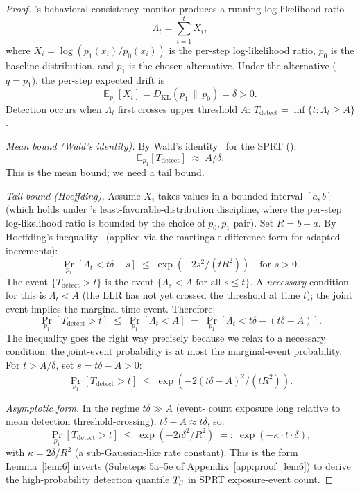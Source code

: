 \begin{proof}
\citep[Exogenous~Verification]{lasser2026exo}'s behavioral consistency monitor produces a running
log-likelihood ratio
\[
  \Lambda_t = \sum_{i=1}^t X_i,
\]
where $X_i = \log(p_1(x_i)/p_0(x_i))$ is the per-step log-likelihood
ratio, $p_0$ is the baseline distribution, and $p_1$ is the chosen
alternative. Under the alternative ($q = p_1$), the per-step
expected drift is
\[
  \mathbb{E}_{p_1}[X_i] = D_{\mathrm{KL}}(p_1 \,\|\, p_0) = \delta > 0.
\]
Detection occurs when $\Lambda_t$ first crosses upper threshold $A$:
$T_{\mathrm{detect}} = \inf\{t : \Lambda_t \geq A\}$.

\emph{Mean bound (Wald's identity).}  By Wald's
identity~\citep{wald1947sequential} for the SPRT (\citep[Proposition:
Behavioral Monitoring Detection Rate]{lasser2026exo}):
\[
  \mathbb{E}_{p_1}[T_{\mathrm{detect}}] \;\approx\; A / \delta.
\]
This is the mean bound; we need a tail bound.

\emph{Tail bound (Hoeffding).}  Assume $X_i$ takes values in a
bounded interval $[a, b]$ (which holds under \citep[Exogenous~Verification]{lasser2026exo}'s
least-favorable-distribution discipline, where the per-step
log-likelihood ratio is bounded by the choice of $p_0, p_1$ pair).
Set $R = b - a$. By Hoeffding's
inequality~\citep{hoeffding1963probability,azuma1967weighted}
(applied via the martingale-difference form for adapted increments):
\[
  \Pr_{p_1}\!\left[\Lambda_t < t \delta - s\right]
  \;\leq\; \exp(-2 s^2 / (t R^2))
  \quad\text{for } s > 0.
\]
The event $\{T_{\mathrm{detect}} > t\}$ is the event $\{\Lambda_s <
A \text{ for all } s \leq t\}$.  A \emph{necessary} condition for
this is $\Lambda_t < A$ (the LLR has not yet crossed the threshold
at time $t$); the joint event implies the marginal-time event.
Therefore:
\[
  \Pr_{p_1}[T_{\mathrm{detect}} > t]
  \;\leq\; \Pr_{p_1}[\Lambda_t < A]
  \;=\; \Pr_{p_1}[\Lambda_t < t\delta - (t\delta - A)].
\]
The inequality goes the right way precisely because we relax to a
necessary condition: the joint-event probability is at most the
marginal-event probability.
For $t > A/\delta$, set $s = t\delta - A > 0$:
\[
  \Pr_{p_1}[T_{\mathrm{detect}} > t]
  \;\leq\; \exp(-2 (t\delta - A)^2 / (t R^2)).
\]

\emph{Asymptotic form.}  In the regime $t\delta \gg A$ (event-
count exposure long relative to mean detection threshold-crossing),
$t\delta - A \approx t\delta$, so:
\[
  \Pr_{p_1}[T_{\mathrm{detect}} > t]
  \;\leq\; \exp(-2 t \delta^2 / R^2)
  \;=:\; \exp(-\kappa \cdot t \cdot \delta),
\]
with $\kappa = 2\delta/R^2$ (a sub-Gaussian-like rate constant).
This is the form Lemma~\ref{lem:6} inverts (Substeps 5a--5e of
Appendix~\ref{app:proof_lem6}) to derive the high-probability
detection quantile $T_{\beta}$ in SPRT exposure-event count.


\end{proof}
